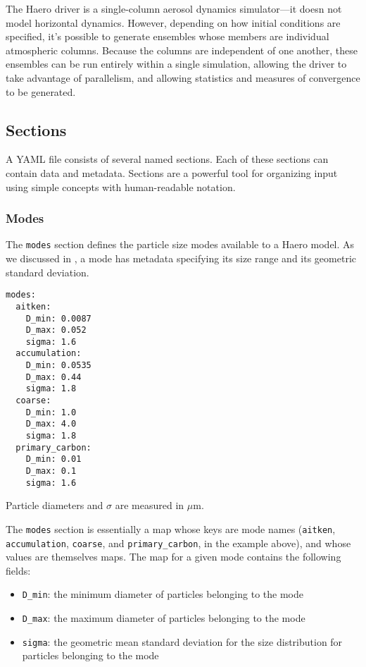 The Haero driver is a single-column aerosol dynamics simulator---it doesn not
model horizontal dynamics. However, depending on how initial conditions are
specified, it's possible to generate ensembles whose members are individual
atmospheric columns. Because the columns are independent of one another, these
ensembles can be run entirely within a single simulation, allowing the driver
to take advantage of parallelism, and allowing statistics and measures of
convergence to be generated.

\subsection*{Sections}

A YAML file consists of several named sections. Each of these sections can
contain data and metadata. Sections are a powerful tool for organizing input
using simple concepts with human-readable notation.

\subsubsection*{Modes}

The \texttt{modes} section defines the particle size modes available to a Haero
model. As we discussed in , a mode has metadata
specifying its size range and its geometric standard deviation.

\begin{verbatim}
modes:
  aitken:
    D_min: 0.0087
    D_max: 0.052
    sigma: 1.6
  accumulation:
    D_min: 0.0535
    D_max: 0.44
    sigma: 1.8
  coarse:
    D_min: 1.0
    D_max: 4.0
    sigma: 1.8
  primary_carbon:
    D_min: 0.01
    D_max: 0.1
    sigma: 1.6
\end{verbatim}

Particle diameters and $\sigma$ are measured in $\mu\mathrm{m}$.

The \texttt{modes} section is essentially a map whose keys are mode names
(\texttt{aitken}, \texttt{accumulation}, \texttt{coarse}, and \texttt{primary\_carbon},
in the example above), and whose values are themselves maps. The map for a given
mode contains the following fields:

\begin{itemize}
  \item \texttt{D\_min}: the minimum diameter of particles belonging to the mode
  \item \texttt{D\_max}: the maximum diameter of particles belonging to the mode
  \item \texttt{sigma}: the geometric mean standard deviation for the size
                        distribution for particles belonging to the mode
\end{itemize}

